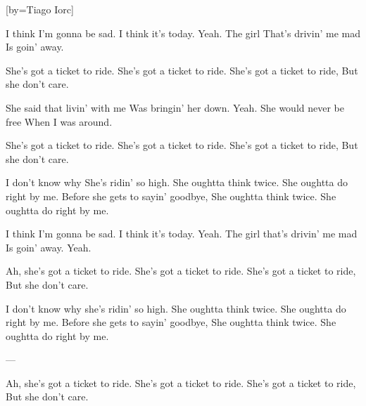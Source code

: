 [by={Tiago Iorc}]

  \chordsoff

  \beginverse

  I think I'm gonna be sad.
  I think it's today.
  Yeah.
  The girl
  That's drivin' me mad
  Is goin' away.
  \endverse

  \beginchorus
  
  She's got a ticket to ride.
  She's got a ticket to ride.
  She's got a ticket to ride,
  But she don't care.
  \endchorus

  \beginverse
  She said that livin' with me
  Was bringin' her down.
  Yeah.
  She would never be free
  When I was around.
  \endverse

  \beginchorus
  She's got a ticket to ride.
  She's got a ticket to ride.
  She's got a ticket to ride,
  But she don't care.
  \endchorus

  \beginverse
  I don't know why
  She's ridin' so high.
  She oughtta think twice.
  She oughtta do right by me.
  Before she gets to sayin' goodbye,
  She oughtta think twice.
  She oughtta do right by me.
  \endverse

  \beginverse
  I think I'm gonna be sad.
  I think it's today.
  Yeah.
  The girl that's drivin' me mad
  Is goin' away.
  Yeah.
  \endverse

  \beginchorus
  Ah, she's got a ticket to ride.
  She's got a ticket to ride.
  She's got a ticket to ride,
  But she don't care.
  \endchorus

  \beginverse
  I don't know why she's ridin' so high.
  She oughtta think twice.
  She oughtta do right by me.
  Before she gets to sayin' goodbye,
  She oughtta think twice.
  She oughtta do right by me.
  \endverse

  \beginverse
  ---
  \endverse

  \beginchorus
  Ah, she's got a ticket to ride.
  She's got a ticket to ride.
  She's got a ticket to ride,
  But she don't care.
  \endchorus
  


\endsong
